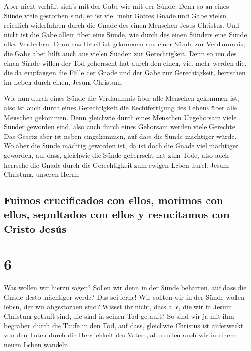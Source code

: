  Aber nicht verhält sich's mit der Gabe wie mit der
Sünde. Denn so an eines Sünde viele gestorben sind, so ist viel mehr
Gottes Gnade und Gabe vielen reichlich widerfahren durch die Gnade des
einen Menschen Jesus Christus.  Und nicht ist die Gabe
allein über eine Sünde, wie durch des einen Sünders eine Sünde alles
Verderben. Denn das Urteil ist gekommen aus einer Sünde zur Verdammnis;
die Gabe aber hilft auch aus vielen Sünden zur Gerechtigkeit.
 Denn so um des einen Sünde willen der Tod geherrscht hat
durch den einen, viel mehr werden die, die da empfangen die Fülle der
Gnade und der Gabe zur Gerechtigkeit, herrschen im Leben durch einen,
Jesum Christum.

 Wie nun durch eines Sünde die Verdammnis über alle
Menschen gekommen ist, also ist auch durch eines Gerechtigkeit die
Rechtfertigung des Lebens über alle Menschen gekommen. 
Denn gleichwie durch eines Menschen Ungehorsam viele Sünder geworden
sind, also auch durch eines Gehorsam werden viele Gerechte.
 Das Gesetz aber ist neben eingekommen, auf dass die
Sünde mächtiger würde. Wo aber die Sünde mächtig geworden ist, da ist
doch die Gnade viel mächtiger geworden,  auf dass,
gleichwie die Sünde geherrscht hat zum Tode, also auch herrsche die
Gnade durch die Gerechtigkeit zum ewigen Leben durch Jesum Christum,
unseren Herrn.

\hypertarget{fuimos-crucificados-con-ellos-morimos-con-ellos-sepultados-con-ellos-y-resucitamos-con-cristo-jesuxfas}{%
\subsection{Fuimos crucificados con ellos, morimos con ellos, sepultados
con ellos y resucitamos con Cristo
Jesús}\label{fuimos-crucificados-con-ellos-morimos-con-ellos-sepultados-con-ellos-y-resucitamos-con-cristo-jesuxfas}}

\hypertarget{section-5}{%
\section{6}\label{section-5}}

 Was wollen wir hierzu sagen? Sollen wir denn in der Sünde
beharren, auf dass die Gnade desto mächtiger werde?  Das
sei ferne! Wie sollten wir in der Sünde wollen leben, der wir
abgestorben sind?  Wisset ihr nicht, dass alle, die wir in
Jesum Christum getauft sind, die sind in seinen Tod getauft?
 So sind wir ja mit ihm begraben durch die Taufe in den
Tod, auf dass, gleichwie Christus ist auferweckt von den Toten durch die
Herrlichkeit des Vaters, also sollen auch wir in einem neuen Leben
wandeln.

